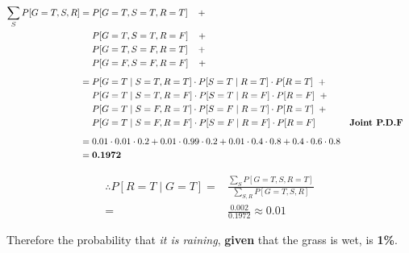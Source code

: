 \begin{equation*}
\begin{aligned}
\sum_{S} P[G = T, S, R] ={} &  P[G = T, S = T, R = T] \hspace{2mm} \hspace{2mm} + \\
									  {} &  P[G = T, S = T, R = F] \hspace{2mm} \hspace{2mm} + \\
									  {} &  P[G = T, S = F, R = T] \hspace{2mm} \hspace{2mm} + \\
									  {} &  P[G = F, S = F, R = F] \hspace{2mm} \hspace{2mm} + \\[2mm]
							 	    ={} & P[G = T \mid S = T, R = T] \cdot P[S = T \mid R = T] \cdot P[R = T ]  \hspace{2mm}+ \\
							 	    	  {} & P[G = T \mid S = T, R = F] \cdot P[S = T \mid R = F] \cdot P[R = F ]  \hspace{2mm}+ \\
							 	      {} & P[G = T \mid S = F, R = T] \cdot P[S = F \mid R = T] \cdot P[R = T ]  \hspace{2mm}+ \\
							 		  {} & P[G = T \mid S = F, R = F] \cdot P[S = F \mid R = F] \cdot P[R = F] && \textbf{Joint P.D.F} \\[2mm]
							 	    ={} & 0.01 \cdot 0.01 \cdot 0.2 + 0.01 \cdot 0.99 \cdot 0.2 + 0.01 \cdot 0.4 \cdot 0.8 + 0.4 \cdot 0.6 \cdot 0.8 \\
							 	    ={} & \textbf{0.1972}
\end{aligned}
\end{equation*}

\begin{equation*}
\begin{aligned}
\therefore P[R = T \mid G = T] ={} & \frac{\sum_{S} P[G = T, S, R = T]}{\sum_{S,R} P[G = T, S, R]} \\
							  ={} & \frac{0.002}{0.1972} \approx 0.01
\end{aligned}
\end{equation*}

Therefore the probability that \emph{it is raining}, \textbf{given} that the grass is wet, is \textbf{1\%}.\\


